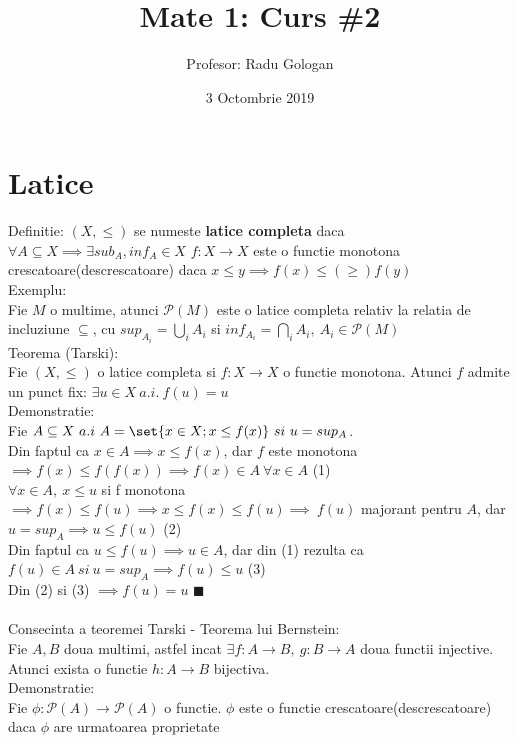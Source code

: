 \documentclass{article}
\title{Mate 1: Curs \#2}
\author{Profesor: Radu Gologan}
\date{3 Octombrie 2019}
\newcommand*{\QEDA}{\hfill\ensuremath{\blacksquare}}%
\begin{document}
    
    \maketitle
    \section{Latice}
        Definitie: $(X,\leq)$ se numeste \textbf{latice completa} daca $\forall A \subseteq X\implies \exists sub_A,inf_A\in X$
        $f:X\rightarrow X$ este o functie monotona crescatoare(descrescatoare) daca $x\leq y \implies f(x)\leq(\geq)f(y)$\\
        Exemplu:\\
        Fie $M$ o multime, atunci $\mathscr{P}(M)$ este o latice completa relativ la relatia de incluziune $\subseteq$, cu $sup_{A_i} =
        \displaystyle{\bigcup_{i}} A_i$ si $inf_{A_i}=\displaystyle{\bigcap_{i}}A_i,\ A_i\in \mathscr{P}(M)$\\
        Teorema (Tarski):\\
        Fie $(X,\leq)$ o latice completa si $f:X\rightarrow X$ o functie monotona. Atunci $f$ admite un punct fix: $\exists u \in X\ a.i.\ f(u)=u$\\
        Demonstratie:\\
        Fie $A\subseteq X\ a.i\ A=\set{x\in X;x\leq f(x)}\ si\ u = sup_A$.\\ 
        Din faptul ca $x\in A \implies x\leq f(x)$, dar $f$ este monotona $\implies f(x)\leq f(f(x)) \implies f(x) \in A\ \forall x\in
        A$ \hfill (1)\\
        $\forall x\in A,\ x\leq u$ si f monotona $\implies f(x) \leq f(u)\implies x\leq f(x)\leq f(u)\implies\ f(u)$ majorant pentru $A$, dar $u=sup_A\implies u
        \leq f(u)$ \hfill (2)\\
        Din faptul ca $u\leq f(u) \implies u\in A$, dar din (1) rezulta ca $f(u)\in A\ si\ u=sup_A \implies f(u)\leq u$ \hfill (3)\\
        Din (2) si (3) $\implies f(u)=u$ \hfill \QEDA\\ \\
        Consecinta a teoremei Tarski - Teorema lui Bernstein:\\
        Fie $A,B$ doua multimi, astfel incat $\exists f:A\rightarrow B,\ g:B\rightarrow A$ doua functii injective. Atunci exista o functie $h:A\rightarrow B$
        bijectiva.\\
        Demonstratie:\\
        Fie $\phi:\mathscr{P}(A)\rightarrow \mathscr{P}(A)$ o functie. $\phi$ este o functie crescatoare(descrescatoare) daca $\phi$ are urmatoarea proprietate
\end{document}
